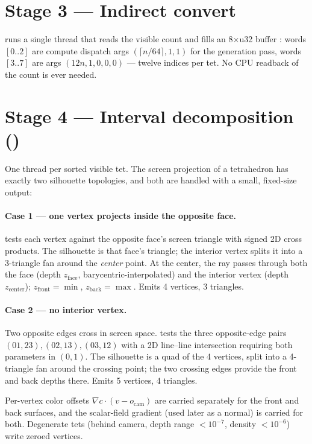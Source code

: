 \section{Stage 3 --- Indirect convert}

 runs a single thread that reads the
visible count and fills an 8$\times$u32 buffer :
words $[0..2]$ are compute dispatch args
$(\lceil n/64 \rceil, 1, 1)$ for the generation pass, words $[3..7]$ are
 args $(12n, 1, 0, 0, 0)$ --- twelve indices per
tet. No CPU readback of the count is ever needed.

\section{Stage 4 --- Interval decomposition ()}

One thread per sorted visible tet. The screen projection of a tetrahedron has
exactly two silhouette topologies, and both are handled with a small,
fixed-size output:

\paragraph{Case 1 --- one vertex projects inside the opposite face.}
 tests each vertex against the opposite face's
screen triangle with signed 2D cross products. The silhouette is that face's
triangle; the interior vertex splits it into a 3-triangle fan around the
\emph{center} point. At the center, the ray passes through both the face
(depth $z_{\text{face}}$, barycentric-interpolated) and the interior vertex
(depth $z_{\text{center}}$); $z_{\text{front}} = \min$,
$z_{\text{back}} = \max$. Emits 4 vertices, 3 triangles.

\paragraph{Case 2 --- no interior vertex.} Two opposite edges cross in
screen space.  tests the three opposite-edge pairs
$(01,23), (02,13), (03,12)$ with a 2D line--line intersection requiring both
parameters in $(0,1)$. The silhouette is a quad of the 4 vertices, split into
a 4-triangle fan around the crossing point; the two crossing edges provide
the front and back depths there. Emits 5 vertices, 4 triangles.

Per-vertex color offsets $\nabla c \cdot (v - o_{\text{cam}})$ are carried
separately for the front and back surfaces, and the scalar-field gradient
(used later as a normal) is carried for both. Degenerate tets (behind camera,
depth range $< 10^{-7}$, density $< 10^{-6}$) write zeroed vertices.

